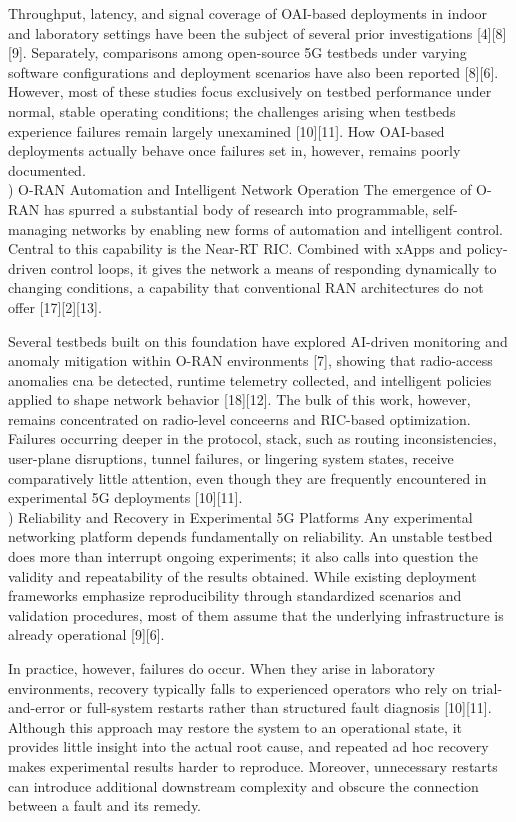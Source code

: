 \documentclass[conference]{IEEEtran}
\begin{document}
Throughput, latency, and signal coverage of OAI-based deployments in indoor and laboratory settings have been the subject of several prior investigations [4][8][9]. Separately, comparisons among open-source 5G testbeds under varying software configurations and deployment scenarios have also been reported [8][6]. However, most of these studies focus exclusively on testbed performance under normal, stable operating conditions; the challenges arising when testbeds experience failures remain largely unexamined [10][11]. How OAI-based deployments actually behave once failures set in, however, remains poorly documented.\\

) O-RAN Automation and Intelligent Network Operation
The emergence of O-RAN has spurred a substantial body of research into programmable, self-managing networks by enabling new forms of automation and intelligent control. Central to this capability is the Near-RT RIC. Combined with xApps and policy-driven control loops, it gives the network a means of responding dynamically to changing conditions, a capability that conventional RAN architectures do not offer [17][2][13].

Several testbeds built on this foundation have explored AI-driven monitoring and anomaly mitigation within O-RAN environments [7], showing that radio-access anomalies cna be detected, runtime telemetry collected, and intelligent policies applied to shape network behavior [18][12]. The bulk of this work, however, remains concentrated on radio-level conceerns and RIC-based optimization. Failures occurring deeper in the protocol, stack, such as routing inconsistencies, user-plane disruptions, tunnel failures, or lingering system states, receive comparatively little attention, even though they are frequently encountered in experimental 5G deployments [10][11].\\

) Reliability and Recovery in Experimental 5G Platforms
Any experimental networking platform depends fundamentally on reliability. An unstable testbed does more than interrupt ongoing experiments; it also calls into question the validity and repeatability of the results obtained. While existing deployment frameworks emphasize reproducibility through standardized scenarios and validation procedures, most of them assume that the underlying infrastructure is already operational [9][6].

In practice, however, failures do occur. When they arise in laboratory environments, recovery typically falls to experienced operators who rely on trial-and-error or full-system restarts rather than structured fault diagnosis [10][11]. Although this approach may restore the system to an operational state, it provides little insight into the actual root cause, and repeated ad hoc recovery makes experimental results harder to reproduce. Moreover, unnecessary restarts can introduce additional downstream complexity and obscure the connection between a fault and its remedy.\\
\end{document}
